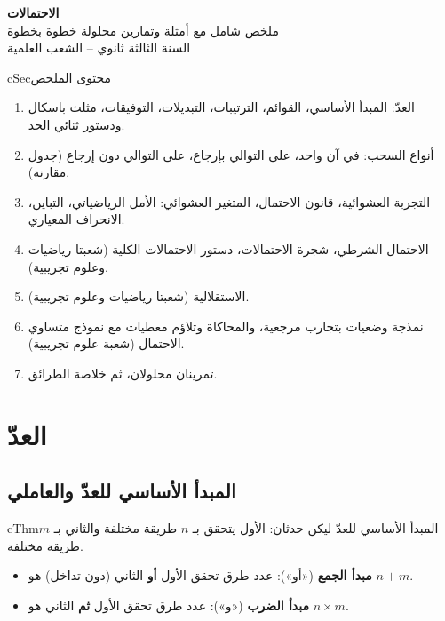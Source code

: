 \documentclass[12pt,a4paper]{article}
\newenvironment{BOX}[2]{\begin{otherlanguage}{english}\begin{arbox}{#1}{#2}}{\end{arbox}\end{otherlanguage}}
\newenvironment{khassia}[1][خاصية]{\begin{BOX}{cThm}{#1}}{\end{BOX}}
\newenvironment{LTR}{\begin{otherlanguage}{english}}{\end{otherlanguage}}
\begin{document}
\begin{LTR}
\begin{tcolorbox}[enhanced,colback=cSec,colframe=cSec,arc=3mm,halign=center,boxrule=0pt,top=12pt,bottom=12pt,before upper={\selectlanguage{arabic}}]
{\color{white}\fontsize{28}{34}\selectfont\bfseries الاحتمالات}\\[8pt]
{\color{white}\large ملخص شامل مع أمثلة وتمارين محلولة خطوة بخطوة}\\[5pt]
{\color{white}\large السنة الثالثة ثانوي -- الشعب العلمية}
\end{tcolorbox}
\end{LTR}

\begin{BOX}{cSec}{محتوى الملخص}
\begin{enumerate}[label=\textbf{\arabic*.}]
\item العدّ: المبدأ الأساسي، القوائم، الترتيبات، التبديلات، التوفيقات، مثلث باسكال ودستور ثنائي الحد.
\item أنواع السحب: في آن واحد، على التوالي بإرجاع، على التوالي دون إرجاع (جدول مقارنة).
\item التجربة العشوائية، قانون الاحتمال، المتغير العشوائي: الأمل الرياضياتي، التباين، الانحراف المعياري.
\item الاحتمال الشرطي، شجرة الاحتمالات، دستور الاحتمالات الكلية (شعبتا رياضيات وعلوم تجريبية).
\item الاستقلالية (شعبتا رياضيات وعلوم تجريبية).
\item نمذجة وضعيات بتجارب مرجعية، والمحاكاة وتلاؤم معطيات مع نموذج متساوي الاحتمال (شعبة علوم تجريبية).
\item تمرينان محلولان، ثم خلاصة الطرائق.
\end{enumerate}
\end{BOX}

\section{العدّ}
\subsection{المبدأ الأساسي للعدّ والعاملي}
\begin{khassia}[المبدأ الأساسي للعدّ]
ليكن حدثان: الأول يتحقق بـ $n$ طريقة مختلفة والثاني بـ $m$ طريقة مختلفة.
\begin{itemize}
\item \textbf{مبدأ الجمع} («أو»): عدد طرق تحقق الأول \textbf{أو} الثاني (دون تداخل) هو $n+m$.
\item \textbf{مبدأ الضرب} («و»): عدد طرق تحقق الأول \textbf{ثم} الثاني هو $n\times m$.
\end{itemize}
\end{khassia}
\end{document}
